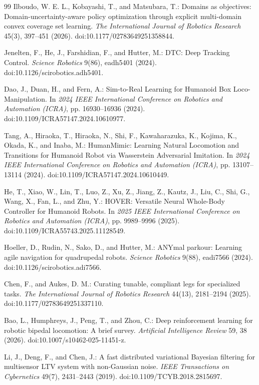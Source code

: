 \documentclass[twoside,final,1p,times]{elsarticle}
\begin{document}
\begin{thebibliography}{99}
Ilboudo, W. E. L., Kobayashi, T., and Matsubara, T.: Domains as objectives: Domain-uncertainty-aware policy optimization through explicit multi-domain convex coverage set learning.
\emph{The International Journal of Robotics Research} 45(3), 397--451 (2026). doi:10.1177/02783649251358844.

Jenelten, F., He, J., Farshidian, F., and Hutter, M.: DTC: Deep Tracking Control.
\emph{Science Robotics} 9(86), eadh5401 (2024). doi:10.1126/scirobotics.adh5401.

Dao, J., Duan, H., and Fern, A.: Sim-to-Real Learning for Humanoid Box Loco-Manipulation.
In \emph{2024 IEEE International Conference on Robotics and Automation (ICRA)}, pp. 16930--16936 (2024). doi:10.1109/ICRA57147.2024.10610977.

Tang, A., Hiraoka, T., Hiraoka, N., Shi, F., Kawaharazuka, K., Kojima, K., Okada, K., and Inaba, M.: HumanMimic: Learning Natural Locomotion and Transitions for Humanoid Robot via Wasserstein Adversarial Imitation.
In \emph{2024 IEEE International Conference on Robotics and Automation (ICRA)}, pp. 13107--13114 (2024). doi:10.1109/ICRA57147.2024.10610449.

He, T., Xiao, W., Lin, T., Luo, Z., Xu, Z., Jiang, Z., Kautz, J., Liu, C., Shi, G., Wang, X., Fan, L., and Zhu, Y.: HOVER: Versatile Neural Whole-Body Controller for Humanoid Robots.
In \emph{2025 IEEE International Conference on Robotics and Automation (ICRA)}, pp. 9989--9996 (2025). doi:10.1109/ICRA55743.2025.11128549.

Hoeller, D., Rudin, N., Sako, D., and Hutter, M.: ANYmal parkour: Learning agile navigation for quadrupedal robots.
\emph{Science Robotics} 9(88), eadi7566 (2024). doi:10.1126/scirobotics.adi7566.

Chen, F., and Aukes, D. M.: Curating tunable, compliant legs for specialized tasks.
\emph{The International Journal of Robotics Research} 44(13), 2181--2194 (2025). doi:10.1177/02783649251337110.

Bao, L., Humphreys, J., Peng, T., and Zhou, C.: Deep reinforcement learning for robotic bipedal locomotion: A brief survey.
\emph{Artificial Intelligence Review} 59, 38 (2026). doi:10.1007/s10462-025-11451-z.

Li, J., Deng, F., and Chen, J.: A fast distributed variational Bayesian filtering for multisensor LTV system with non-Gaussian noise.
\emph{IEEE Transactions on Cybernetics} 49(7), 2431--2443 (2019). doi:10.1109/TCYB.2018.2815697.


\end{thebibliography}
\end{document}
